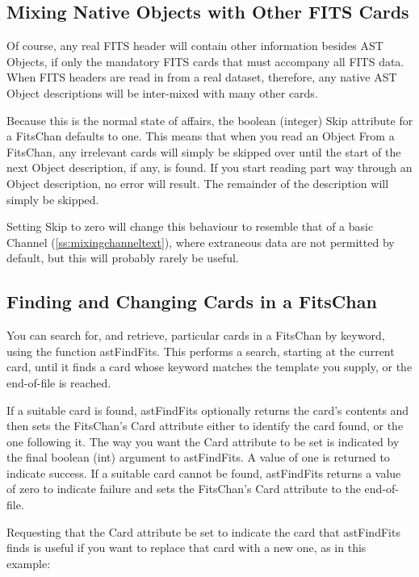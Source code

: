 \documentclass[twoside,11pt]{article}
\newcommand{\htmlref}[2]{#1}
\newcommand{\secref}[1]{\S\ref{#1}}
\renewcommand{\secref}[1]{\ref{#1}}
\begin{document}
\subsection{Mixing Native Objects with Other FITS Cards}

Of course, any real FITS header will contain other information besides
AST Objects, if only the mandatory FITS cards that must accompany all
FITS data. When FITS headers are read in from a real dataset,
therefore, any native AST \htmlref{Object}{Object} descriptions will be inter-mixed with
many other cards.

Because this is the normal state of affairs, the boolean (integer)
\htmlref{Skip}{Skip} attribute for a \htmlref{FitsChan}{FitsChan} defaults to one. This means that when
you read an Object From a FitsChan, any irrelevant cards will simply
be skipped over until the start of the next Object description, if
any, is found. If you start reading part way through an Object
description, no error will result. The remainder of the description
will simply be skipped.

Setting Skip to zero will change this behaviour to resemble that of a
basic \htmlref{Channel}{Channel} (\secref{ss:mixingchanneltext}), where extraneous data
are not permitted by default, but this will probably rarely be useful.

\subsection{\label{ss:findingandchangingfits}Finding and Changing Cards in a FitsChan}

You can search for, and retrieve, particular cards in a \htmlref{FitsChan}{FitsChan} by
keyword, using the function \htmlref{astFindFits}{astFindFits}. This performs a search,
starting at the current card, until it finds a card whose keyword
matches the template you supply, or the end-of-file is reached.

If a suitable card is found, astFindFits optionally returns the card's
contents and then sets the FitsChan's \htmlref{Card}{Card} attribute either to
identify the card found, or the one following it. The way you want the
Card attribute to be set is indicated by the final boolean (int)
argument to astFindFits. A value of one is returned to indicate
success.  If a suitable card cannot be found, astFindFits returns a
value of zero to indicate failure and sets the FitsChan's Card
attribute to the end-of-file.

Requesting that the Card attribute be set to indicate the card that
astFindFits finds is useful if you want to replace that card with a
new one, as in this example:
\end{document}
